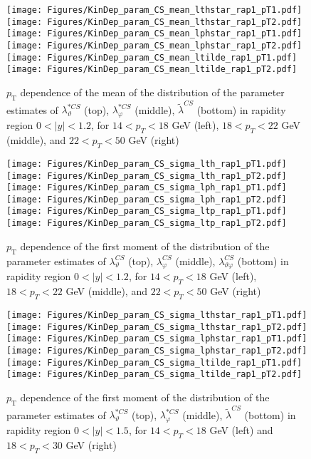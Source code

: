 \documentclass[12pt]{article}
\newcommand{\pT}{p_\mathrm{T}}
\newcommand{\absy}{\left |  y \right |}
\newcommand{\lamthCS}{\lambda^{\scriptscriptstyle CS}_\vartheta}
\newcommand{\lamphCS}{\lambda^{\scriptscriptstyle CS}_\varphi}
\newcommand{\lamthphCS}{\lambda^{\scriptscriptstyle CS}_{\vartheta \varphi}}
\newcommand{\lamtildeCS}{\tilde{\lambda}^{\scriptscriptstyle CS}}
\newcommand{\lamthstarCS}{\lambda^{* \scriptscriptstyle CS}_\vartheta}
\newcommand{\lamphstarCS}{\lambda^{* \scriptscriptstyle CS}_\varphi}
\begin{document}
\begin{figure}[htbp]
\centering
\texttt{[image: Figures/KinDep\_param\_CS\_mean\_lthstar\_rap1\_pT1.pdf]}
\texttt{[image: Figures/KinDep\_param\_CS\_mean\_lthstar\_rap1\_pT2.pdf]}
\texttt{[image: Figures/KinDep\_param\_CS\_mean\_lphstar\_rap1\_pT1.pdf]}
\texttt{[image: Figures/KinDep\_param\_CS\_mean\_lphstar\_rap1\_pT2.pdf]}
\texttt{[image: Figures/KinDep\_param\_CS\_mean\_ltilde\_rap1\_pT1.pdf]}
\texttt{[image: Figures/KinDep\_param\_CS\_mean\_ltilde\_rap1\_pT2.pdf]}
\caption{$\pT$ dependence of the mean of the distribution of the parameter estimates of $\lamthstarCS$ (top), $\lamphstarCS$ (middle), $\lamtildeCS$ (bottom) in rapidity
region $0<\absy<1.2$, for $14 < p_T < 18$ GeV (left), $18 < p_T < 22$ GeV (middle), and $22 < p_T < 50$ GeV (right)}
\end{figure}
\clearpage


\begin{figure}[htbp]
\centering
\texttt{[image: Figures/KinDep\_param\_CS\_sigma\_lth\_rap1\_pT1.pdf]}
\texttt{[image: Figures/KinDep\_param\_CS\_sigma\_lth\_rap1\_pT2.pdf]}
\texttt{[image: Figures/KinDep\_param\_CS\_sigma\_lph\_rap1\_pT1.pdf]}
\texttt{[image: Figures/KinDep\_param\_CS\_sigma\_lph\_rap1\_pT2.pdf]}
\texttt{[image: Figures/KinDep\_param\_CS\_sigma\_ltp\_rap1\_pT1.pdf]}
\texttt{[image: Figures/KinDep\_param\_CS\_sigma\_ltp\_rap1\_pT2.pdf]}
\caption{$\pT$ dependence of the first moment of the distribution of the parameter estimates of $\lamthCS$ (top), $\lamphCS$ (middle), $\lamthphCS$ (bottom) in rapidity
region $0<\absy<1.2$, for $14 < p_T < 18$ GeV (left), $18 < p_T < 22$ GeV (middle), and $22 < p_T < 50$ GeV (right)}
\end{figure}
\clearpage

\begin{figure}[htbp]
\centering
\texttt{[image: Figures/KinDep\_param\_CS\_sigma\_lthstar\_rap1\_pT1.pdf]}
\texttt{[image: Figures/KinDep\_param\_CS\_sigma\_lthstar\_rap1\_pT2.pdf]}
\texttt{[image: Figures/KinDep\_param\_CS\_sigma\_lphstar\_rap1\_pT1.pdf]}
\texttt{[image: Figures/KinDep\_param\_CS\_sigma\_lphstar\_rap1\_pT2.pdf]}
\texttt{[image: Figures/KinDep\_param\_CS\_sigma\_ltilde\_rap1\_pT1.pdf]}
\texttt{[image: Figures/KinDep\_param\_CS\_sigma\_ltilde\_rap1\_pT2.pdf]}
\caption{$\pT$ dependence of the first moment of the distribution of the parameter estimates of $\lamthstarCS$ (top), $\lamphstarCS$ (middle), $\lamtildeCS$ (bottom) in rapidity region $0<\absy<1.5$, for $14 < p_T < 18$ GeV (left) and
$18 < p_T < 30$ GeV (right)}
\end{figure}
\clearpage
\end{document}
